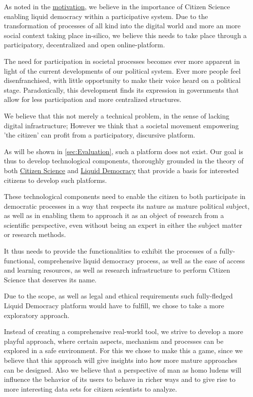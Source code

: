 As noted in the \href{ssec:Motivation}{motivation}, we believe in the importance of Citizen Science enabling liquid democracy within a participative system. Due to the transformation of processes of all kind into the digital world and more an more social context taking place in-silico, we believe this needs to take place through a participatory, decentralized and open online-platform.

The need for participation in societal processes becomes ever more apparent in light of the current developments of our political system. Ever more people feel disenfranchised, with little opportunity to make their voice heard on a political stage. Paradoxically, this development finds its expression in governments that allow for less participation and more centralized structures.

We believe that this not merely a technical problem, in the sense of lacking digital infrastructure; However we think that a societal movement empowering 'the citizen' can profit from a participatory, discursive platform.

As will be shown in \ref{sec:Evaluation}, such a platform does not exist. Our goal is thus to develop technological components, thoroughly grounded in the theory of both \href{sec:Theory_CS}{Citizen Science} and \href{sec:Theory_LD}{Liquid Democracy} that provide a basis for interested citizens to develop such platforms.

These technological components need to enable the citizen to both participate in democratic processes in a way that respects its nature as mature political subject, as well as in enabling them to approach it as an object of research from a scientific perspective, even without being an expert in either the subject matter or research methods. 

It thus needs to provide the functionalities to exhibit the processes of a fully-functional, comprehensive liquid democracy process, as well as the ease of access and learning resources, as well as research infrastructure to perform Citizen Science that deserves its name.

Due to the scope, as well as legal and ethical requirements such fully-fledged Liquid Democracy platform would have to fulfill, we chose to take a more exploratory approach. 

Instead of creating a comprehensive real-world tool, we strive to develop a more playful approach, where certain aspects, mechanism and processes can be explored in a safe environment. For this we chose to make this a game, since we believe that this approach will give insights into how more mature approaches can be designed. Also we believe that a perspective of man as homo ludens will influence the behavior of its users to behave in richer ways and to give rise to more interesting data sets for citizen scientists to analyze.

